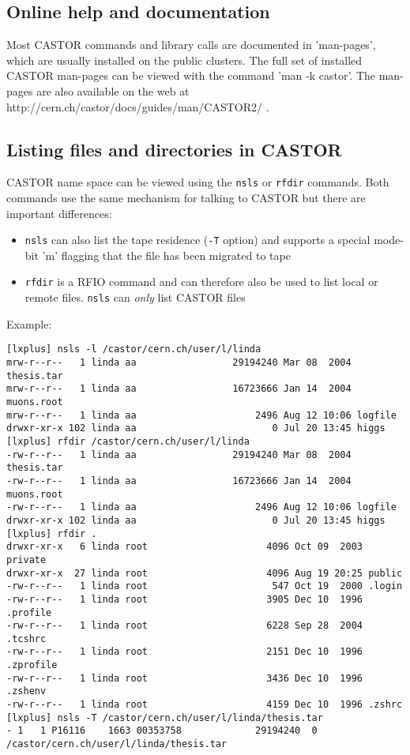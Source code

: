 \subsection{Online help and documentation}
Most CASTOR commands and library calls are documented in 'man-pages', which are usually installed
on the public clusters. The full set of installed CASTOR man-pages can be viewed with the
command 'man -k castor'. The man-pages are also available on the web at
http://cern.ch/castor/docs/guides/man/CASTOR2/ .

\subsection{Listing files and directories in CASTOR}
CASTOR name space can be viewed using the {\tt nsls} or {\tt rfdir} commands. Both commands
use the same mechanism for talking to CASTOR but there are important differences:
\begin{itemize}
    \item {\tt nsls} can also list the tape residence ({\tt -T} option) and supports a
          special mode-bit 'm' flagging that the file has been migrated to tape
    \item {\tt rfdir} is a RFIO command and can therefore also be used to list local or
          remote files. {\tt nsls} can {\em only} list CASTOR files
\end{itemize}

Example:
\small
\begin{verbatim}
[lxplus] nsls -l /castor/cern.ch/user/l/linda
mrw-r--r--   1 linda aa                 29194240 Mar 08  2004 thesis.tar
mrw-r--r--   1 linda aa                 16723666 Jan 14  2004 muons.root
mrw-r--r--   1 linda aa                     2496 Aug 12 10:06 logfile
drwxr-xr-x 102 linda aa                        0 Jul 20 13:45 higgs
[lxplus] rfdir /castor/cern.ch/user/l/linda
-rw-r--r--   1 linda aa                 29194240 Mar 08  2004 thesis.tar
-rw-r--r--   1 linda aa                 16723666 Jan 14  2004 muons.root
-rw-r--r--   1 linda aa                     2496 Aug 12 10:06 logfile
drwxr-xr-x 102 linda aa                        0 Jul 20 13:45 higgs
[lxplus] rfdir .
drwxr-xr-x   6 linda root                     4096 Oct 09  2003 private
drwxr-xr-x  27 linda root                     4096 Aug 19 20:25 public
-rw-r--r--   1 linda root                      547 Oct 19  2000 .login
-rw-r--r--   1 linda root                     3905 Dec 10  1996 .profile
-rw-r--r--   1 linda root                     6228 Sep 28  2004 .tcshrc
-rw-r--r--   1 linda root                     2151 Dec 10  1996 .zprofile
-rw-r--r--   1 linda root                     3436 Dec 10  1996 .zshenv
-rw-r--r--   1 linda root                     4159 Dec 10  1996 .zshrc
[lxplus] nsls -T /castor/cern.ch/user/l/linda/thesis.tar
- 1   1 P16116    1663 00353758             29194240  0 /castor/cern.ch/user/l/linda/thesis.tar
\end{verbatim}
\normalsize

